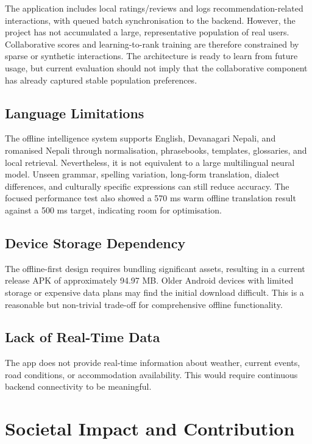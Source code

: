 \documentclass[12pt,a4paper,oneside]{report}
\begin{document}
The application includes local ratings/reviews and logs recommendation-related interactions, with queued batch synchronisation to the backend. However, the project has not accumulated a large, representative population of real users. Collaborative scores and learning-to-rank training are therefore constrained by sparse or synthetic interactions. The architecture is ready to learn from future usage, but current evaluation should not imply that the collaborative component has already captured stable population preferences.

\subsection{Language Limitations}

The offline intelligence system supports English, Devanagari Nepali, and romanised Nepali through normalisation, phrasebooks, templates, glossaries, and local retrieval. Nevertheless, it is not equivalent to a large multilingual neural model. Unseen grammar, spelling variation, long-form translation, dialect differences, and culturally specific expressions can still reduce accuracy. The focused performance test also showed a 570 ms warm offline translation result against a 500 ms target, indicating room for optimisation.

\subsection{Device Storage Dependency}

The offline-first design requires bundling significant assets, resulting in a current release APK of approximately 94.97 MB. Older Android devices with limited storage or expensive data plans may find the initial download difficult. This is a reasonable but non-trivial trade-off for comprehensive offline functionality.

\subsection{Lack of Real-Time Data}

The app does not provide real-time information about weather, current events, road conditions, or accommodation availability. This would require continuous backend connectivity to be meaningful.

\section{Societal Impact and Contribution}
\label{sec:impact}
\end{document}
